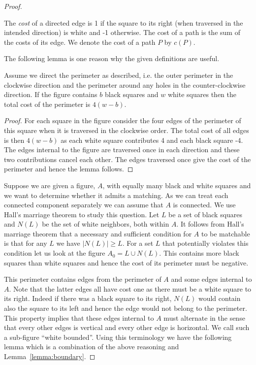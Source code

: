 \documentclass{article}\usepackage[a4paper,margin=20mm]{geometry}
\begin{document}
\begin{proof}
\begin{definition}
The {\em cost} of a directed edge is 1 if the square to its
right (when traversed in the intended direction) is white
and -1 otherwise.  The cost of a path is the sum
of the costs of its edge.  We denote the cost of
a path $P$ by $c(P)$.
\end{definition}

The following lemma is one reason why the given
definitions are useful.

\begin{lemma}\label{lemma:boundary}
Assume we direct the perimeter as described, i.e.
the outer perimeter in the clockwise direction and
the perimeter around any holes in the counter-clockwise
direction.  If the figure contains
$b$ black squares and $w$ white squares
then the total cost of the perimeter is $4(w-b)$.
\end{lemma}

\begin{proof}
For each square in the figure consider
the four edges of the perimeter of this
square when it is traversed in
the clockwise order.   The total cost
of all edges is then $4(w-b)$ as each white square contributes
4 and each black square -4.  The 
edges internal to the figure are traversed once
in each direction and these two contributions
cancel each other.  The edges traversed once
give the cost of the perimeter and hence
the lemma follows.
\end{proof}

Suppose we are given a figure, $A$, with equally many
black and white squares and we want to determine
whether it admits a matching.  As we can treat
each connected component separately we can assume
that $A$ is connected.
We use Hall's marriage theorem to
study this question.  Let $L$ be a set of
black squares and $N(L)$ be the set of white
neighbors, both within $A$.  It follows from 
Hall's marriage theorem that a necessary and sufficient
condition for $A$ to be matchable is that for any $L$ we have $|N(L)| \geq L$.
For a set $L$ that potentially violates this condition let us
look at the figure $A_0=L \cup N(L)$.  This contains
more black squares than white squares and hence
the cost of its perimeter must be negative.

This perimeter contains edges from the perimeter
of $A$ and some edges internal to $A$.  Note that the 
latter edges all have cost one as there must be a white
square to its right.  Indeed if there was a black square
to its right, $N(L)$ would contain also the square to its left
and hence the edge would not belong to the perimeter.
This property implies that these edges internal to
$A$ must alternate in the sense that every other
edges is vertical and every other edge is horizontal.
We call such a sub-figure ``white bounded''.  Using this
terminology we have the following lemma which is a combination
of the above reasoning and Lemma~\ref{lemma:boundary}.


\end{proof}
\end{document}

